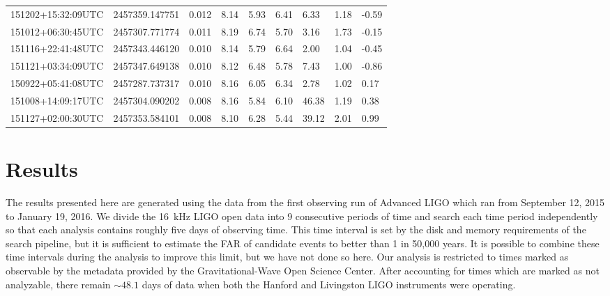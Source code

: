 \begin{table}[ht!]
\begin{center}
\begin{tabularx}{1.0\textwidth}{lllllllll}
151202+15:32:09UTC & 2457359.147751 &      0.012 & 8.14 & 5.93 & 6.41 & 6.33 & 1.18 & -0.59 \\
151012+06:30:45UTC & 2457307.771774 &      0.011 & 8.19 & 6.74 & 5.70 & 3.16 & 1.73 & -0.15 \\
151116+22:41:48UTC & 2457343.446120 &      0.010 & 8.14 & 5.79 & 6.64 & 2.00 & 1.04 & -0.45 \\
151121+03:34:09UTC & 2457347.649138 &      0.010 & 8.12 & 6.48 & 5.78 & 7.43 & 1.00 & -0.86 \\
150922+05:41:08UTC & 2457287.737317 &      0.010 & 8.16 & 6.05 & 6.34 & 2.78 & 1.02 & 0.17 \\
151008+14:09:17UTC & 2457304.090202 &      0.008 & 8.16 & 5.84 & 6.10 & 46.38 & 1.19 & 0.38 \\
151127+02:00:30UTC & 2457353.584101 &      0.008 & 8.10 & 6.28 & 5.44 & 39.12 & 2.01 & 0.99 \\


\end{tabularx}
  \end{center}
\end{table}


\section{Results}
\label{sec:results}


The results presented here are generated using the data from the first observing run of Advanced LIGO which ran from September 12, 2015 to January 19, 2016. We divide the 16~kHz LIGO open data into 9 consecutive periods of time and search each time period independently so that each analysis contains roughly five days of observing time. This time interval is set by the disk and memory requirements of the search pipeline, but it is sufficient to estimate the FAR of candidate events to better than 1 in 50,000 years. It is possible to combine these time intervals during the analysis to improve this limit, but we have not done so here. Our analysis is restricted to times marked as observable by the metadata provided by the Gravitational-Wave Open Science Center. After accounting for times which are marked as not analyzable, there remain $\sim48.1$ days of data when both the Hanford and Livingston LIGO instruments were operating.

